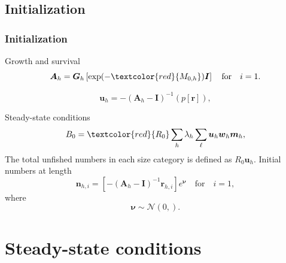 \documentclass{beamer}
\begin{document}
\subsection{Initialization}
\begin{frame}
\frametitle{Initialization}
Growth and survival
\begin{equation*}
  \boldsymbol{A}_{h} = \boldsymbol{G}_h \left[ \exp (-\textcolor{red}{M_{0,h}})
    \boldsymbol{I} \right] \quad \text{for} \quad i=1.
\end{equation*}

\begin{equation*}
  \boldsymbol{u}_h = -(\boldsymbol{A}_h - \boldsymbol{I})^{-1} (p[\boldsymbol{r}]),
\end{equation*}

Steady-state conditions
\begin{equation*}
  B_0 = \textcolor{red}{R_0} \sum_h \lambda_h \sum_\ell \boldsymbol{u}_h
  \boldsymbol{w}_{h} \boldsymbol{m}_{h},
\end{equation*}
The total unfished numbers in each size category is defined as $R_0
\boldsymbol{u}_h$. Initial numbers at length
\begin{equation*}
  \boldsymbol{n}_{h,i} = \left[-\left( \boldsymbol{A}_{h} - \boldsymbol{I}
    \right)^{-1} \boldsymbol{r}_{h,i} \right] e^{\boldsymbol\nu} \quad
  \text{for} \quad i=1,
\end{equation*}
where
\begin{equation*}
  \boldsymbol\nu \sim \mathcal{N} \left( 0,  \right).
\end{equation*}
\end{frame}





\section{Steady-state conditions}

\end{document}
